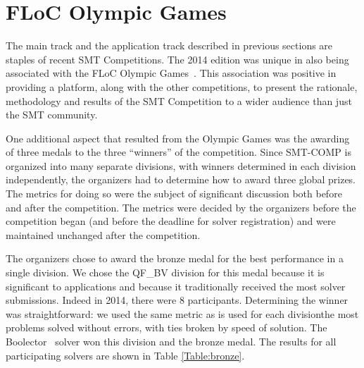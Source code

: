 \documentclass[twoside,11pt]{article}
\begin{document}
\section{FLoC Olympic Games}
\label{sec:floc}

The main track and the application track described in previous sections are staples of recent SMT Competitions. The 2014 edition was unique in also being associated with the FLoC Olympic Games~\cite{FLoCGames}.
This association was positive in providing a platform, along with the other competitions, to present the
rationale, methodology and results of the SMT Competition to a wider audience than just the SMT community.

One additional aspect that resulted from the Olympic Games was the awarding of three medals to the three ``winners'' of the competition. Since SMT-COMP is organized into many separate divisions, with winners determined in each division independently, the organizers had to determine how to award three global prizes.
The metrics for doing so were the subject of significant discussion both before and after the competition.
The metrics were decided by the organizers before the competition began (and before the deadline for solver registration) and were maintained unchanged after the competition.

The organizers chose to award the bronze medal for the best performance in a single division. We chose  the QF\_BV division for this medal because it is significant to applications and because it traditionally received the most solver submissions. Indeed in 2014, there were 8 participants. Determining the winner was straightforward: we used the same metric as is used for each division\textemdash the most problems solved without errors, with ties broken by speed of solution. The Boolector~\cite{boolector} solver won this division and the bronze medal. The results for all participating solvers are shown in Table \ref{Table:bronze}.
\end{document}
